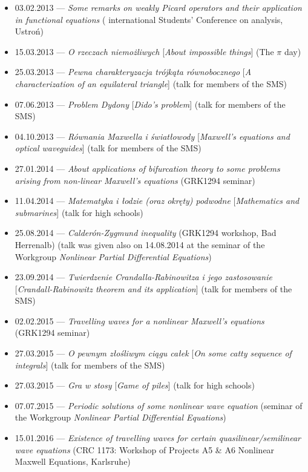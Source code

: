 \begin{itemize}
  \item 03.02.2013 --- \textsl{Some remarks on weakly Picard operators and their application in functional equations} ( international Students' Conference on analysis, Ustroń)
  \item 15.03.2013 --- \textsl{O rzeczach niemożliwych} [\textsl{About impossible things}] (The $\pi$ day)
  \item 25.03.2013 --- \textsl{Pewna charakteryzacja trójkąta równobocznego} [\textsl{A characterization of an equilateral triangle}] (talk for members of the SMS)
  \item 07.06.2013 --- \textsl{Problem Dydony} [\textsl{Dido's problem}] (talk for members of the SMS)
  \item 04.10.2013 --- \textsl{Równania Maxwella i światłowody} [\textsl{Maxwell's equations and optical waveguides}] (talk for members of the SMS)
  \item 27.01.2014 --- \textsl{About applications of bifurcation theory to some problems arising from non-linear Maxwell's equations} (GRK1294 seminar)
  \item 11.04.2014 --- \textsl{Matematyka i łodzie (oraz okręty) podwodne} [\textsl{Mathematics and submarines}] (talk for high schools)
  \item 25.08.2014 --- \textsl{Calderón-Zygmund inequality} (GRK1294 workshop, Bad Herrenalb) (talk was given also on 14.08.2014 at the seminar of the Workgroup \textit{Nonlinear Partial Differential Equations})
  \item 23.09.2014 --- \textsl{Twierdzenie Crandalla-Rabinowitza i jego zastosowanie} [\textsl{Crandall-Rabinowitz theorem and its application}] (talk for members of the SMS)
  \item 02.02.2015 --- \textsl{Travelling waves for a nonlinear Maxwell's equations} (GRK1294 seminar)
  \item 27.03.2015 --- \textsl{O pewnym złośliwym ciągu całek} [\textsl{On some catty sequence of integrals}] (talk for members of the SMS)
  \item 27.03.2015 --- \textsl{Gra w stosy} [\textsl{Game of piles}] (talk for high schools)
  \item 07.07.2015 --- \textsl{Periodic solutions of some nonlinear wave equation} (seminar of the Workgroup \textit{Nonlinear Partial Differential Equations})
  \item 15.01.2016 --- \textsl{Existence of travelling waves for certain quasilinear/semilinear wave equations} (CRC 1173: Workshop of Projects A5 \& A6 Nonlinear Maxwell Equations, Karlsruhe)

\end{itemize}

